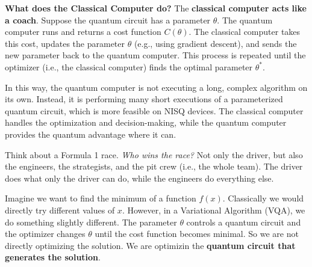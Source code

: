 \highspace
\textcolor{Green3}{ \textbf{What does the Classical Computer do?}} The \textbf{classical computer acts like a coach}. Suppose the quantum circuit has a parameter $\theta$. The quantum computer runs and returns a cost function $C(\theta)$. The classical computer takes this cost, updates the parameter $\theta$ (e.g., using gradient descent), and sends the new parameter back to the quantum computer. This process is repeated until the optimizer (i.e., the classical computer) finds the optimal parameter $\theta^*$.

\highspace
In this way, the quantum computer is not executing a long, complex algorithm on its own. Instead, it is performing many short executions of a parameterized quantum circuit, which is more feasible on NISQ devices. The classical computer handles the optimization and decision-making, while the quantum computer provides the quantum advantage where it can.

\highspace
\begin{examplebox}[: Analogy]
    Think about a Formula 1 race. \emph{Who wins the race?} Not only the driver, but also the engineers, the strategists, and the pit crew (i.e., the whole team). The driver does what only the driver can do, while the engineers do everything else.
\end{examplebox}

\highspace
\begin{examplebox}
    Imagine we want to find the minimum of a function $f(x)$. Classically we would directly try different values of $x$. However, in a Variational Algorithm (VQA), we do something slightly different. The parameter $\theta$ controls a quantum circuit and the optimizer changes $\theta$ until the cost function becomes minimal. So we are not directly optimizing the solution. We are optimizin the \textbf{quantum circuit that generates the solution}.
\end{examplebox}